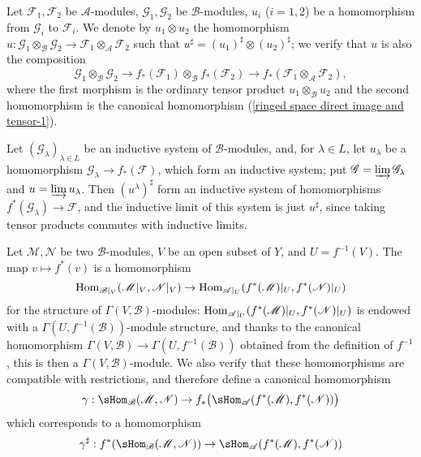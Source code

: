 Let $\mathscr{F}_1,\mathscr{F}_2$ be $\mathscr{A}$-modules, $\mathscr{G}_1,\mathscr{G}_2$ be $\mathscr{B}$-modules, $u_i$ ($i=1,2$) be a homomorphism from $\mathscr{G}_i$ to $\mathscr{F}_i$. We denote by $u_1\otimes u_2$ the homomorphism $u:\mathscr{G}_1\otimes_{\mathscr{B}}\mathscr{G}_2\to\mathscr{F}_1\otimes_{\mathscr{A}}\mathscr{F}_2$ such that $u^{\sharp}=(u_1)^{\sharp}\otimes(u_2)^{\sharp}$; we verify that $u$ is also the composition
\[\mathscr{G}_1\otimes_{\mathscr{B}}\mathscr{G}_2\to f_*(\mathscr{F}_1)\otimes_{\mathscr{B}}f_*(\mathscr{F}_2)\to f_*(\mathscr{F}_1\otimes_{\mathscr{A}}\mathscr{F}_2),\]
where the first morphism is the ordinary tensor product $u_1\otimes_{\mathscr{B}}u_2$ and the second homomorphism is the canonical homomorphism (\ref{ringed space direct image and tensor-1}).\par
Let $(\mathscr{G}_\lambda)_{\lambda\in L}$ be an inductive system of $\mathscr{B}$-modules, and, for $\lambda\in L$, let $u_\lambda$ be a homomorphism $\mathscr{G}_\lambda\to f_*(\mathscr{F})$, which form an inductive system; put $\mathscr{G}=\varinjlim\limits\mathscr{G}_\lambda$ and $u=\varinjlim\limits u_\lambda$. Then $(u^\lambda)^{\sharp}$ form an inductive system of homomorphisms $f^*(\mathscr{G}_\lambda)\to\mathscr{F}$, and the inductive limit of this system is just $u^{\sharp}$, since taking tensor products commutes with inductive limits.\par
Let $\mathscr{M},\mathscr{N}$ be two $\mathscr{B}$-modules, $V$ be an open subset of $Y$, and $U=f^{-1}(V)$. The map $v\mapsto f^*(v)$ is a homomorphism
\[\mathrm{Hom}_{\mathscr{B}|_V}(\mathscr{M}|_V,\mathscr{N}|_V)\to\mathrm{Hom}_{\mathscr{A}|_U}(f^*(\mathscr{M})|_U,f^*(\mathscr{N})|_U)\]
for the structure of $\Gamma(V,\mathscr{B})$-modules: $\mathrm{Hom}_{\mathscr{A}|_U}(f^*(\mathscr{M})|_U,f^*(\mathscr{N})|_U)$ is endowed with a $\Gamma(U,f^{-1}(\mathscr{B}))$-module structure, and thanks to the canonical homomorphism $\Gamma(V,\mathscr{B})\to\Gamma(U,f^{-1}(\mathscr{B}))$ obtained from the definition of $f^{-1}$, this is then a $\Gamma(V,\mathscr{B})$-module. We also verify that these homomorphisms are compatible with restrictions, and therefore define a canonical homomorphism
\[\gamma:\sHom_{\mathscr{B}}(\mathscr{M},\mathscr{N})\to f_*\big(\sHom_{\mathscr{A}}(f^*(\mathscr{M}),f^*(\mathscr{N}))\big)\]
which corresponds to a homomorphism
\begin{align}\label{ringed space inverse image and sheaf Hom}
\gamma^{\sharp}:f^*(\sHom_{\mathscr{B}}(\mathscr{M},\mathscr{N}))\to\sHom_{\mathscr{A}}(f^*(\mathscr{M}),f^*(\mathscr{N}))
\end{align}
